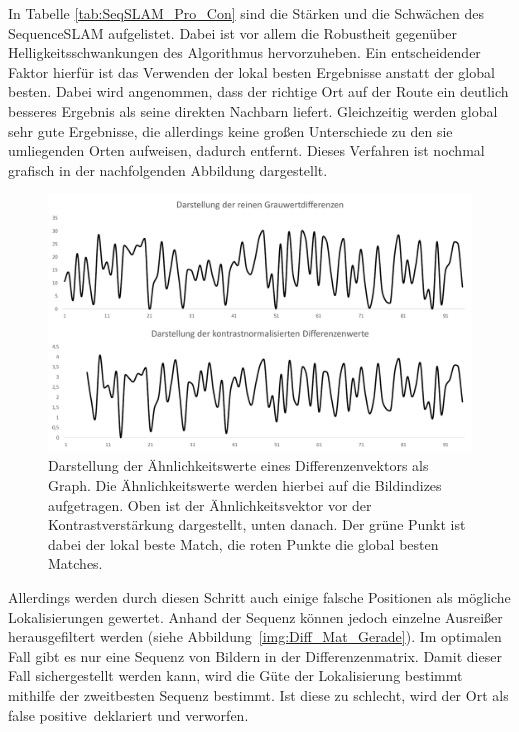 \documentclass[12pt,a4paper,titlepage]{scrartcl}
\begin{document}
In Tabelle \ref{tab:SeqSLAM_Pro_Con} sind die Stärken und die Schwächen des SequenceSLAM aufgelistet. Dabei ist vor allem die Robustheit gegenüber Helligkeitsschwankungen des Algorithmus hervorzuheben. Ein entscheidender Faktor hierfür ist das Verwenden der lokal besten Ergebnisse anstatt der global besten. Dabei wird angenommen, dass der richtige Ort auf der Route ein deutlich besseres Ergebnis als seine direkten Nachbarn liefert. Gleichzeitig werden global sehr gute Ergebnisse, die allerdings keine großen Unterschiede zu den sie umliegenden Orten aufweisen, dadurch entfernt. Dieses Verfahren ist nochmal grafisch in der nachfolgenden Abbildung dargestellt. 
\begin{figure}[h]
	\centering
	\includegraphics[width=1.0\textwidth]{../Bilder/lokale_Kontrastverstaerkung.pdf}
	\caption[Lokale Kontrastnormalisierung der Grauwertvektoren]{Darstellung der Ähnlichkeitswerte eines Differenzenvektors als Graph. Die Ähnlichkeitswerte werden hierbei auf die Bildindizes aufgetragen. Oben ist der Ähnlichkeitsvektor vor der Kontrastverstärkung dargestellt, unten danach. Der grüne Punkt ist dabei der lokal beste Match, die roten Punkte die global besten Matches.}
	\label{img:Kon_Verst}
\end{figure}

Allerdings werden durch diesen Schritt auch einige falsche Positionen als mögliche Lokalisierungen gewertet. Anhand der Sequenz können jedoch einzelne Ausreißer herausgefiltert werden (siehe Abbildung~\ref{img:Diff_Mat_Gerade}). Im optimalen Fall gibt es nur eine Sequenz von Bildern in der Differenzenmatrix. Damit dieser Fall sichergestellt werden kann, wird die Güte der Lokalisierung bestimmt mithilfe der zweitbesten Sequenz bestimmt. Ist diese zu schlecht, wird der Ort als \glqq false positive\grqq \ deklariert und verworfen.
\end{document}
